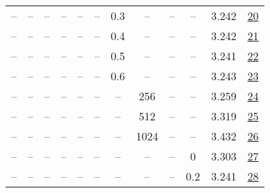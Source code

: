\begin{table}[H]
\begin{tabular}{cccccccccccc}
-- & -- & -- & -- & -- & -- & 0.3 & -- & -- & -- & 3.242 & \href{https://wandb.ai/stanford-mercury/optimizer-scaling/runs/sweep-300m-6B-sciond6c4a32lr0.008-wd0.1-minlr0-warmup0-b10.98-gn-c70e3a}{20} \\
-- & -- & -- & -- & -- & -- & 0.4 & -- & -- & -- & 3.242 & \href{https://wandb.ai/stanford-mercury/optimizer-scaling/runs/sweep-300m-6B-sciond4688b4lr0.008-wd0.1-minlr0-warmup0-b10.98-gn-cc3a61}{21} \\
-- & -- & -- & -- & -- & -- & 0.5 & -- & -- & -- & 3.241 & \href{https://wandb.ai/stanford-mercury/optimizer-scaling/runs/sweep-300m-6B-sciond8d54b4lr0.008-wd0.1-minlr0-warmup0-b10.98-gn-e2040c}{22} \\
-- & -- & -- & -- & -- & -- & 0.6 & -- & -- & -- & 3.243 & \href{https://wandb.ai/stanford-mercury/optimizer-scaling/runs/sweep-300m-6B-scionda31eablr0.008-wd0.1-minlr0-warmup0-b10.98-gn-ed268b}{23} \\
-- & -- & -- & -- & -- & -- & -- & 256 & -- & -- & 3.259 & \href{https://wandb.ai/stanford-mercury/optimizer-scaling/runs/sweep-300m-6B-sciond8e6297lr0.008-wd0.1-minlr0-warmup0-b10.98-gn-6108e9}{24} \\
-- & -- & -- & -- & -- & -- & -- & 512 & -- & -- & 3.319 & \href{https://wandb.ai/stanford-mercury/optimizer-scaling/runs/sweep-300m-6B-sciond374b61lr0.008-wd0.1-minlr0-warmup0-b10.98-gn-c7f214}{25} \\
-- & -- & -- & -- & -- & -- & -- & 1024 & -- & -- & 3.432 & \href{https://wandb.ai/stanford-mercury/optimizer-scaling/runs/sweep-300m-6B-sciond7a848flr0.008-wd0.1-minlr0-warmup0-b10.98-gn-9d7008}{26} \\
-- & -- & -- & -- & -- & -- & -- & -- & -- & 0 & 3.303 & \href{https://wandb.ai/stanford-mercury/optimizer-scaling/runs/sweep-300m-6B-sciond3438f5lr0.008-wd0-minlr0-warmup0-b10.98-gn2--e2425a}{27} \\
-- & -- & -- & -- & -- & -- & -- & -- & -- & 0.2 & 3.241 & \href{https://wandb.ai/stanford-mercury/optimizer-scaling/runs/sweep-300m-6B-sciond9f11fclr0.008-wd0.2-minlr0-warmup0-b10.98-gn-585125}{28} \\
\bottomrule
\end{tabular}
\end{table}

